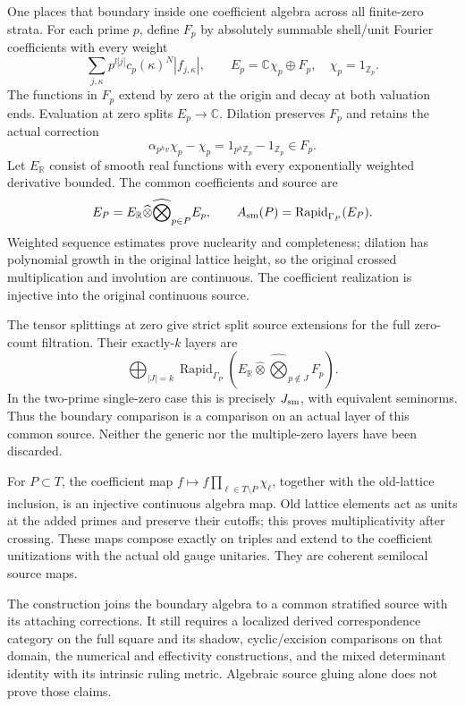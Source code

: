 \documentclass[11pt]{amsart}
\theoremstyle{definition}
\theoremstyle{remark}
\begin{document}
One places that boundary inside one coefficient algebra across
all finite-zero strata. For each prime $p$, define $F_p$ by absolutely
summable shell/unit Fourier coefficients with every weight
\[
 \sum_{j,\kappa}p^{l|j|}c_p(\kappa)^N|f_{j,\kappa}|,
 \qquad E_p=\mathbb C\chi_p\oplus F_p,
 \quad \chi_p=1_{\mathbb Z_p}.
\]
The functions in $F_p$ extend by zero at the origin and decay at both
valuation ends. Evaluation at zero splits $E_p\to\mathbb C$.
Dilation preserves $F_p$ and retains the actual correction
\[
 \alpha_{p^h v}\chi_p-\chi_p
       =1_{p^h\mathbb Z_p}-1_{\mathbb Z_p}\in F_p.
\]
Let $E_{\mathbb R}$ consist of smooth real functions with every
exponentially weighted derivative bounded. The common coefficients and
source are
\[
 E_P=E_{\mathbb R}\widehat\otimes\widehat\bigotimes_{p\in P}E_p,
 \qquad A_{\rm sm}(P)=\operatorname{Rapid}_{\Gamma_P}(E_P).
\]
Weighted sequence estimates prove nuclearity and completeness; dilation
has polynomial growth in the original lattice height, so the original
crossed multiplication and involution are continuous. The coefficient
realization is injective into the original continuous source.

The tensor splittings at zero give strict split source extensions
for the full zero-count filtration. Their exactly-$k$ layers are
\[
 \bigoplus_{|J|=k}\operatorname{Rapid}_{\Gamma_P}
 \left(E_{\mathbb R}\widehat\otimes
       \widehat\bigotimes_{p\notin J}F_p\right).
\]
In the two-prime single-zero case this is precisely $J_{\rm sm}$,
with equivalent seminorms. Thus the boundary comparison is a comparison
on an actual layer of this common source. Neither the generic nor the
multiple-zero layers have been discarded.

For $P\subset T$, the coefficient map
$f\mapsto f\prod_{\ell\in T\setminus P}\chi_\ell$, together with the
old-lattice inclusion, is an injective continuous algebra map. Old
lattice elements act as units at the added primes and preserve their
cutoffs; this proves multiplicativity after crossing. These maps compose
exactly on triples and extend to the coefficient unitizations with the
actual old gauge unitaries. They are coherent semilocal source maps.

The construction joins the boundary algebra to a common stratified
source with its attaching corrections. It still requires a localized
derived correspondence category on the full square and its shadow,
cyclic/excision comparisons on that domain, the numerical and effectivity
constructions, and the mixed determinant identity with its intrinsic
ruling metric. Algebraic source gluing alone does not prove those claims.
\end{document}
